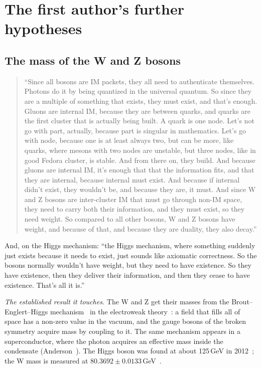 \documentclass[11pt,a4paper]{article}
\theoremstyle{definition}
\theoremstyle{remark}
\begin{document}
\section{The first author's further hypotheses}\label{sec:further}

\subsection{The mass of the W and Z bosons}

\begin{quote}
``Since all bosons are IM packets, they all need to authenticate themselves. Photons do it by being quantized in the universal quantum. So
since they are a multiple of something that exists, they must exist, and that's enough. Gluons are internal IM, because they are between
quarks, and quarks are the first cluster that is actually being built. A quark is one node. Let's not go with part, actually, because part
is singular in mathematics. Let's go with node, because one is at least always two, but can be more, like quarks, where mesons with two
nodes are unstable, but three nodes, like in good Fedora cluster, is stable. And from there on, they build. And because gluons are
internal IM, it's enough that that the information fits, and that they are internal, because internal must exist. And because if internal
didn't exist, they wouldn't be, and because they are, it must. And since W and Z bosons are inter-cluster IM that must go through non-IM
space, they need to carry both their information, and they must exist, so they need weight. So compared to all other bosons, W and Z
bosons have weight, and because of that, and because they are duality, they also decay.''
\end{quote}

\noindent And, on the Higgs mechanism: ``the Higgs mechanism, where something suddenly just exists because it needs to exist, just sounds
like axiomatic correctness. So the bosons normally wouldn't have weight, but they need to have existence. So they have existence, then
they deliver their information, and then they cease to have existence. That's all it is.''

\noindent\emph{The established result it touches.} The W and Z get their masses from the Brout--Englert--Higgs mechanism~\cite{be,higgs}
in the electroweak theory~\cite{weinberg}: a field that fills all of space has a non-zero value in the vacuum, and the gauge bosons of the
broken symmetry acquire mass by coupling to it. The same mechanism appears in a superconductor, where the photon acquires an effective mass
inside the condensate (Anderson~\cite{anderson}). The Higgs boson was found at about 125\,GeV in 2012~\cite{atlas,cms}; the W mass is
measured at $80.3692\pm0.0133$\,GeV~\cite{pdgw}.
\end{document}
